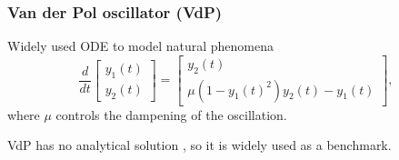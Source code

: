\documentclass[t]{beamer}
\begin{document}
\begin{frame}
    \frametitle{Van der Pol oscillator (VdP)}
    Widely used ODE to model natural phenomena \[
    \frac{d}{dt}\begin{bmatrix} y_1\left( t \right) \\ y_2\left( t \right)  \end{bmatrix} = \begin{bmatrix} 
y_2\left( t \right) \\
\mu\left( 1-y_1\left( t \right) ^2 \right) y_2\left( t \right) - y_1(t)
\end{bmatrix} 
    ,\] where $\mu$ controls the dampening of the oscillation.

    \pause
    \quad

    VdP has no analytical solution \cite{panayotounakos_lack_2003}, so it is widely used as a benchmark.
\end{frame}
\end{document}
